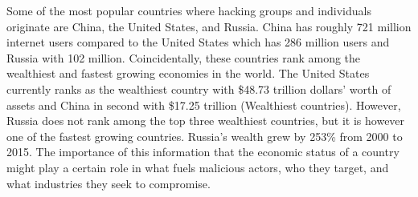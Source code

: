 \documentclass[./main.tex]{subfiles}
\begin{document}
Some of the most popular countries where hacking groups and individuals originate are China, the United States, and Russia. China has roughly 721 million internet users compared to the United States which has 286 million users and Russia with 102 million. Coincidentally, these countries rank among the wealthiest and fastest growing economies in the world. The United States currently ranks as the wealthiest country with \$48.73 trillion dollars’ worth of assets and China in second with \$17.25 trillion (Wealthiest countries). However, Russia does not rank among the top three wealthiest countries, but it is however one of the fastest growing countries. Russia’s wealth grew by 253\% from 2000 to 2015. The importance of this information that the economic status of a country might play a certain role in what fuels malicious actors, who they target, and what industries they seek to compromise.
\end{document}
